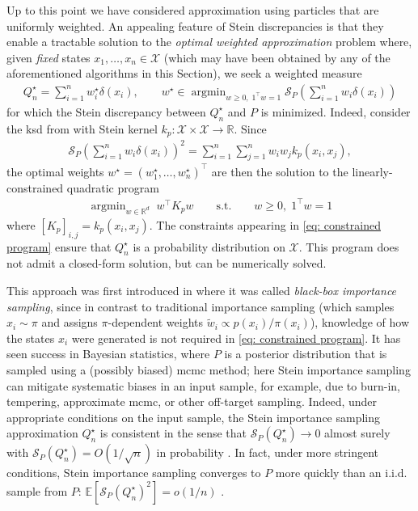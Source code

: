 \documentclass[12pt,paper=letter]{scrreprt}
\def\mbb#1{\mathbb{#1}}
\def\E{\mbb{E}} %
\newcommand{\iid}{\textrm{i.i.d.}\xspace}
\providecommand{\argmin}{\mathop\mathrm{arg min}}
\begin{document}
Up to this point we have considered approximation using particles that are uniformly weighted.
An appealing feature of Stein discrepancies is that they enable a tractable solution to the \emph{optimal weighted approximation} problem where, given \emph{fixed} states $x_1,\dots,x_n \in \mathcal{X}$ (which may have been obtained by any of the aforementioned algorithms in this Section), we seek a weighted measure
\begin{align*}
Q_n^\star = \sum_{i=1}^n w_i^\star \delta(x_i), \qquad w^\star \in \argmin_{w \geq 0, \; 1^\top w = 1} \mathcal{S}_P \left( \sum_{i=1}^n w_i \delta(x_i)  \right) 
\end{align*}
for which the Stein discrepancy between $Q_n^\star$ and $P$ is minimized.
Indeed, consider the \ac{ksd} from  with Stein kernel $k_p : \mathcal{X} \times \mathcal{X} \rightarrow \mathbb{R}$.
Since 
\begin{align*}
    \mathcal{S}_P\left( \sum_{i=1}^n w_i \delta(x_i)  \right)^2 = \sum_{i=1}^n \sum_{j=1}^n w_i w_j k_p(x_i,x_j) ,
\end{align*}
the optimal weights $w^\star = (w_1^\star,\dots,w_n^\star)^\top$ are then the solution to the linearly-constrained quadratic program
\begin{align}
\argmin_{w \in \mathbb{R}^d} \; w^\top K_p w \qquad \text{s.t.} \qquad w \geq 0 , \; 1^\top w = 1  \label{eq: constrained program}
\end{align} 
where $[K_p]_{i,j} = k_p(x_i,x_j)$.
The constraints appearing in \eqref{eq: constrained program} ensure that $Q_n^\star$ is a probability distribution on $\mathcal{X}$.
This program does not admit a closed-form solution, but can be numerically solved.

This approach was first introduced in \citet{liu2017black} where it was called \emph{black-box importance sampling}, since in contrast to traditional importance sampling (which samples $x_i \sim \pi$ and assigns $\pi$-dependent weights $\tilde{w}_i \propto p(x_i) / \pi(x_i)$), knowledge of how the states $x_i$ were generated is not required in \eqref{eq: constrained program}.
It has seen success in Bayesian statistics, where $P$ is a posterior distribution that is sampled using a (possibly biased) \ac{mcmc} method; here Stein importance sampling can mitigate systematic biases in an input sample, for example, due to burn-in, tempering, approximate \ac{mcmc}, or other off-target sampling. 
Indeed, under appropriate conditions on the input sample, the Stein importance sampling approximation $Q_n^\star$ is consistent in the sense that  $\mathcal{S}_P(Q_n^\star) \rightarrow 0$ almost surely \citep[Thm.~3]{riabiz2020optimal} with $\mathcal{S}_P(Q_n^\star) = O(1/\sqrt{n})$ in probability \citep[Thm.~1]{hodgkinson2020reproducing,li2024debiased}. In fact, under more stringent conditions, Stein importance sampling converges to $P$ more quickly than an \iid sample from $P$:  $\E[\mathcal{S}_P(Q_n^\star)^2] = o(1/n)$ \citep[Thm.~2]{li2024debiased}.
\end{document}
